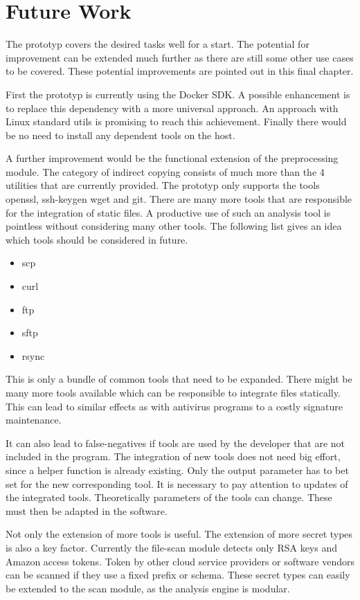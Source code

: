 \chapter{Future Work}
\label{ch:end:future}
The prototyp covers the desired tasks well for a start.
The potential for improvement can be extended much further as there are still some other use cases to be covered.
These potential improvements are pointed out in this final chapter.

First the prototyp is currently using the Docker SDK. 
A possible enhancement is to replace this dependency with a more universal approach. 
An approach with Linux standard utils is promising to reach this achievement.
Finally there would be no need to install any dependent tools on the host.

A further improvement would be the functional extension of the preprocessing module.
The category of indirect copying consists of much more than the 4 utilities that are currently provided.
The prototyp only supports the tools openssl, ssh-keygen wget and git.
There are many more tools that are responsible for the integration of static files. 
A productive use of such an analysis tool is pointless without considering many other tools.
The following list gives an idea which tools should be considered in future.
\begin{itemize}
\item scp
\item curl
\item ftp
\item sftp
\item rsync
\end{itemize}
This is only a bundle of common tools that need to be expanded.
There might be many more tools available which can be responsible to integrate files statically.
This can lead to similar effects as with antivirus programs to a costly signature maintenance.

It can also lead to false-negatives if tools are used by the developer that are not included in the program.
The integration of new tools does not need big effort, since a helper function is already existing.
Only the output parameter has to bet set for the new corresponding tool.
It is necessary to pay attention to updates of the integrated tools.
Theoretically parameters of the tools can change. 
These must then be adapted in the software.

Not only the extension of more tools is useful. The extension of more secret types is also a key factor.
Currently the file-scan module detects only RSA keys and Amazon access tokens.
Token by other cloud service providers or software vendors can be scanned if they use a fixed prefix or schema.
These secret types can easily be extended to the scan module, as the analysis engine is modular.

